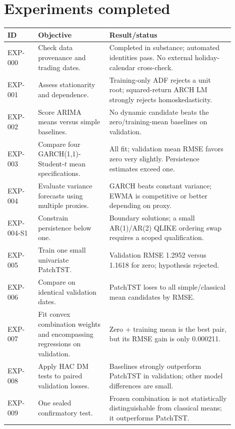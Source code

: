 \documentclass[11pt,a4paper]{article}
\begin{document}
\section{Experiments completed}
\begin{longtable}{>{\raggedright\arraybackslash}p{0.12\linewidth}>{\raggedright\arraybackslash}p{0.29\linewidth}>{\raggedright\arraybackslash}p{0.49\linewidth}}
\toprule
ID & Objective & Result/status\\
\midrule
EXP-000 & Check data provenance and trading dates. & Completed in substance; automated identities pass. No external holiday-calendar cross-check.\\
EXP-001 & Assess stationarity and dependence. & Training-only ADF rejects a unit root; squared-return ARCH LM strongly rejects homoskedasticity.\\
EXP-002 & Score ARIMA means versus simple baselines. & No dynamic candidate beats the zero/training-mean baselines on validation.\\
EXP-003 & Compare four GARCH(1,1)-Student-$t$ mean specifications. & All fit; validation mean RMSE favors zero very slightly. Persistence estimates exceed one.\\
EXP-004 & Evaluate variance forecasts using multiple proxies. & GARCH beats constant variance; EWMA is competitive or better depending on proxy.\\
EXP-004-S1 & Constrain persistence below one. & Boundary solutions; a small AR(1)/AR(2) QLIKE ordering swap requires a scoped qualification.\\
EXP-005 & Train one small univariate PatchTST. & Validation RMSE 1.2952 versus 1.1618 for zero; hypothesis rejected.\\
EXP-006 & Compare on identical validation dates. & PatchTST loses to all simple/classical mean candidates by RMSE.\\
EXP-007 & Fit convex combination weights and encompassing regressions on validation. & Zero + training mean is the best pair, but its RMSE gain is only 0.000211.\\
EXP-008 & Apply HAC DM tests to paired validation losses. & Baselines strongly outperform PatchTST in validation; other model differences are small.\\
EXP-009 & One sealed confirmatory test. & Frozen combination is not statistically distinguishable from classical means; it outperforms PatchTST.\\
\bottomrule
\end{longtable}
\end{document}
